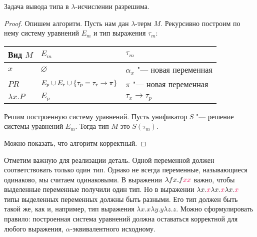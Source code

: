 \begin{theorem}
    Задача вывода типа в $\lambda$-исчислении разрешима.
\end{theorem}

\begin{proof}
    Опишем алгоритм. Пусть нам дан $\lambda$-терм $M$. Рекурсивно построим по нему систему уравнений $E_m$ и тип выражения $\tau_m$:
    \begin{center}
    \begin{tabular}{l l l} \toprule
        Вид $M$         & $E_m$                                                 & $\tau_m$                         \\ \midrule
        $x$             & $\varnothing$                                         & $\alpha_x$ "--- новая переменная \\ \midrule
        $PR$            & $E_p \cup E_r \cup \left\{\tau_p=\tau_r\rightarrow\pi\right\}$ & $\pi$ "--- новая переменная      \\ \midrule
        $\lambda x . P$ & $E_p$                                                 & $\tau_x\rightarrow\tau_p$        \\ \bottomrule
    \end{tabular}
    \end{center}
    Решим построенную систему уравнений.
    Пусть унификатор $S$ "--- решение системы уравнений $E_m$. Тогда тип $M$ это $S(\tau_m)$.

    Можно показать, что алгоритм корректный.
\end{proof}

Отметим важную для реализации деталь. Одной переменной должен соответствовать только один тип.
Однако не всегда переменные, называющиеся одинаково, мы считаем одинаковыми.
В выражении $\lambda f x . f \reduction x \reduction x$ важно, чтобы выделенные переменные получили один тип.
Но в выражении $\lambda x . \reduction x \lambda x . \reduction x \lambda x . \reduction x$ типы выделенных переменных должны быть разными.
Его тип должен быть такой же, как и, например, тип выражения $\lambda x . x \lambda y . y \lambda z . z$.
Можно сформулировать правило: построенная система уравнений должна оставаться корректной для любого выражения,
$\alpha$-эквивалентного исходному.

